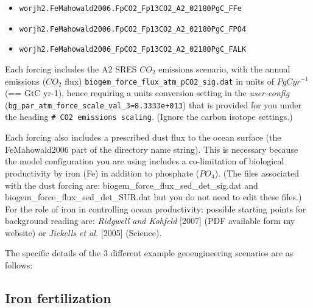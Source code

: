 \vspace{1mm}
\begin{itemize}[noitemsep]
\item
\begin{verbatim}worjh2.FeMahowald2006.FpCO2_Fp13CO2_A2_02180PgC_FFe\end{verbatim}
\item
\begin{verbatim}worjh2.FeMahowald2006.FpCO2_Fp13CO2_A2_02180PgC_FPO4\end{verbatim}
\item
\begin{verbatim}worjh2.FeMahowald2006_FpCO2_Fp13CO2_A2_02180PgC_FALK\end{verbatim}
\end{itemize}
\vspace{1mm}

Each forcing includes the A2  SRES \(CO_{2}\) emissions scenario, with the annual emissions (\(CO_{2}\) flux) \texttt{biogem\_force\_flux\_atm\_pCO2\_sig.dat} in units of \(PgCyr^{-1}\) (== GtC yr-1), hence requiring a units conversion setting in the \textit{user-config} (\texttt{bg\_par\_atm\_force\_scale\_val\_3=8.3333e+013}) that is provided for you under the heading \texttt{\# CO2 emissions scaling}. (Ignore the carbon isotope settings.)

Each forcing also includes a prescribed dust flux to the ocean surface (the \textsf{\footnotesize FeMahowald2006} part of the directory name string). This is necessary because the model configuration you are using includes a co-limitation of biological productivity by iron (Fe) in addition to phosphate (\(PO_{4}\)). (The files associated with the dust forcing are: \textsf{\footnotesize biogem\_force\_flux\_sed\_det\_sig.dat} and \textsf{\footnotesize biogem\_force\_flux\_sed\_det\_SUR.dat} but you do not need to edit these files.) For the role of iron in controlling ocean productivity: possible starting points for background reading are: \textit{Ridgwell and Kohfeld} [2007] (PDF available form my website) or \textit{Jickells et al.} [2005] (Science).

\vspace{1mm}
The specific details of the 3 different example geoengineering scenarios are as follows:


\subsection{Iron fertilization}

